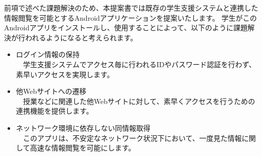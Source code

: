 前項で述べた課題解決のため、本提案書では既存の学生支援システムと連携した情報閲覧を可能とするAndroidアプリケーションを提案いたします。
学生がこのAndroidアプリをインストールし、使用することによって、以下のように課題解決が行われるようになると考えられます。
\begin{itemize}
\item ログイン情報の保持\\
　学生支援システムでアクセス毎に行われるIDやパスワード認証を行わず、素早いアクセスを実現します。
\item 他Webサイトへの遷移\\
　授業などに関連した他Webサイトに対して、素早くアクセスを行うための連携機能を提供します。
\item ネットワーク環境に依存しない同情報取得\\
　このアプリは、不安定なネットワーク状況下において、一度見た情報に関して高速な情報閲覧を可能にします。
\end{itemize}　
